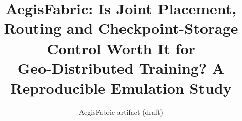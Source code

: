 \documentclass[10pt,twocolumn]{article}
\title{AegisFabric: Is Joint Placement, Routing and Checkpoint-Storage Control Worth It for\\
Geo-Distributed Training? A Reproducible Emulation Study}
\author{AegisFabric artifact (draft)}
\date{}
\begin{document}
\maketitle

\begin{abstract}

\end{abstract}











\small


\end{document}
